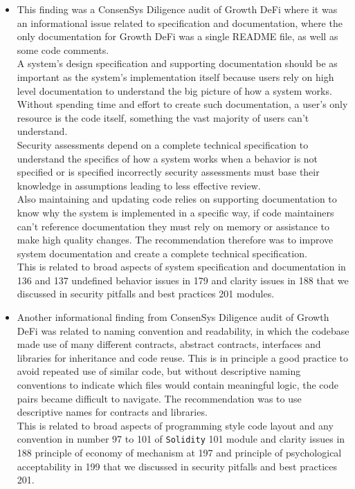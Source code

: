\begin{itemize}
\item
  This finding was a ConsenSys Diligence audit of Growth DeFi where it
  was an informational issue related to specification and documentation,
  where the only documentation for Growth DeFi was a single README file,
  as well as some code comments.\\

  A system's design specification and supporting documentation should be
  as important as the system's implementation itself because users rely
  on high level documentation to understand the big picture of how a
  system works.\\

  Without spending time and effort to create such documentation, a
  user's only resource is the code itself, something the vast majority
  of users can't understand.\\

  Security assessments depend on a complete technical specification to
  understand the specifics of how a system works when a behavior is not
  specified or is specified incorrectly security assessments must base
  their knowledge in assumptions leading to less effective review.\\

  Also maintaining and updating code relies on supporting documentation
  to know why the system is implemented in a specific way, if code
  maintainers can't reference documentation they must rely on memory or
  assistance to make high quality changes. The recommendation therefore
  was to improve system documentation and create a complete technical
  specification.\\

  This is related to broad aspects of system specification and
  documentation in 136 and 137 undefined behavior issues in 179 and
  clarity issues in 188 that we discussed in security pitfalls and best
  practices 201 modules.
\item
  Another informational finding from ConsenSys Diligence audit of Growth
  DeFi was related to naming convention and readability, in which the
  codebase made use of many different contracts, abstract contracts,
  interfaces and libraries for inheritance and code reuse. This is in
  principle a good practice to avoid repeated use of similar code, but
  without descriptive naming conventions to indicate which files would
  contain meaningful logic, the code pairs became difficult to navigate.
  The recommendation was to use descriptive names for contracts and
  libraries.\\

  This is related to broad aspects of programming style code layout and
  any convention in number 97 to 101 of \texttt{Solidity} 101 module and
  clarity issues in 188 principle of economy of mechanism at 197 and
  principle of psychological acceptability in 199 that we discussed in
  security pitfalls and best practices 201.
\end{itemize}

